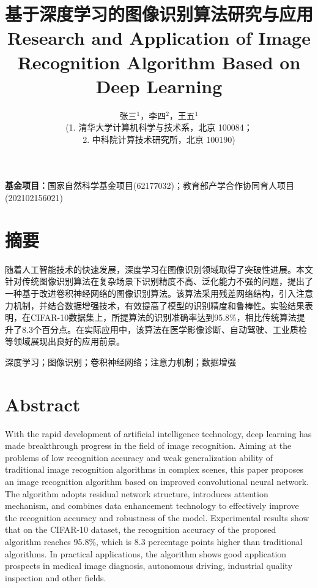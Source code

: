 \documentclass[a4paper,12pt]{article}
\newenvironment{cnabstract}{
    \section*{\heiti\fontsize{9pt}{11pt}\selectfont 摘要}
    \fangsong\fontsize{9pt}{11pt}\selectfont
}{}
\newcommand{\cnkeywords}[1]{
    \vspace{1em}
    \noindent{\heiti\fontsize{9pt}{11pt}\selectfont 关键词：}
    \fangsong\fontsize{9pt}{11pt}\selectfont #1
}
\newenvironment{enabstract}{
    \section*{\textbf{\fontsize{9pt}{11pt}\selectfont Abstract}}
    \fontsize{9pt}{11pt}\selectfont
}{}
\begin{document}
\title{
    \heiti\fontsize{18pt}{22pt}\selectfont
    基于深度学习的图像识别算法研究与应用
    \vspace{0.5em}
    \\ 
    \textbf{\fontsize{14pt}{16pt}\selectfont Research and Application of Image Recognition Algorithm Based on Deep Learning}
}

\author{
    \kaishu\fontsize{12pt}{14pt}\selectfont
    张三$^{1}$，李四$^{2}$，王五$^{1}$ \\
    \songti\fontsize{9pt}{11pt}\selectfont
    (1. 清华大学计算机科学与技术系，北京 100084；\\
     2. 中科院计算技术研究所，北京 100190)
}

\date{}
\maketitle

\noindent\songti\fontsize{9pt}{11pt}\selectfont
\textbf{基金项目：}国家自然科学基金项目(62177032)；教育部产学合作协同育人项目(202102156021)

\vspace{1em}

\begin{cnabstract}
随着人工智能技术的快速发展，深度学习在图像识别领域取得了突破性进展。本文针对传统图像识别算法在复杂场景下识别精度不高、泛化能力不强的问题，提出了一种基于改进卷积神经网络的图像识别算法。该算法采用残差网络结构，引入注意力机制，并结合数据增强技术，有效提高了模型的识别精度和鲁棒性。实验结果表明，在CIFAR-10数据集上，所提算法的识别准确率达到95.8\%，相比传统算法提升了8.3个百分点。在实际应用中，该算法在医学影像诊断、自动驾驶、工业质检等领域展现出良好的应用前景。
\end{cnabstract}

\cnkeywords{深度学习；图像识别；卷积神经网络；注意力机制；数据增强}

\vspace{1em}

\begin{enabstract}
With the rapid development of artificial intelligence technology, deep learning has made breakthrough progress in the field of image recognition. Aiming at the problems of low recognition accuracy and weak generalization ability of traditional image recognition algorithms in complex scenes, this paper proposes an image recognition algorithm based on improved convolutional neural network. The algorithm adopts residual network structure, introduces attention mechanism, and combines data enhancement technology to effectively improve the recognition accuracy and robustness of the model. Experimental results show that on the CIFAR-10 dataset, the recognition accuracy of the proposed algorithm reaches 95.8\%, which is 8.3 percentage points higher than traditional algorithms. In practical applications, the algorithm shows good application prospects in medical image diagnosis, autonomous driving, industrial quality inspection and other fields.
\end{enabstract}
\end{document}
